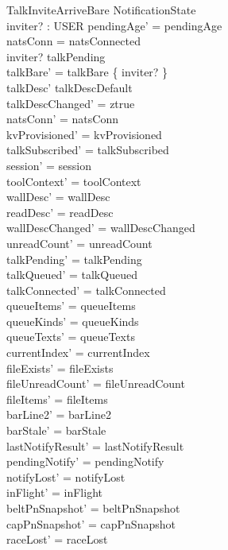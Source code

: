 \documentclass[a4paper,10pt,fleqn]{article}
\begin{document}
\begin{schema}{TalkInviteArriveBare}
  \Delta NotificationState \\
  inviter? : USER
  \where
  pendingAge' = pendingAge \\
  natsConn = natsConnected \\
  inviter? \notin \dom talkPending \\
  talkBare' = talkBare \cup \{ inviter? \} \\
  talkDesc' \neq talkDescDefault \\
  talkDescChanged' = ztrue \\
  natsConn' = natsConn \\
  kvProvisioned' = kvProvisioned \\
  talkSubscribed' = talkSubscribed \\
  session' = session \\
  toolContext' = toolContext \\
  wallDesc' = wallDesc \\
  readDesc' = readDesc \\
  wallDescChanged' = wallDescChanged \\
  unreadCount' = unreadCount \\
  talkPending' = talkPending \\
  talkQueued' = talkQueued \\
  talkConnected' = talkConnected \\
  queueItems' = queueItems \\
  queueKinds' = queueKinds \\
  queueTexts' = queueTexts \\
  currentIndex' = currentIndex \\
  fileExists' = fileExists \\
  fileUnreadCount' = fileUnreadCount \\
  fileItems' = fileItems \\
  barLine2' = barLine2 \\
  barStale' = barStale \\
  lastNotifyResult' = lastNotifyResult \\
  pendingNotify' = pendingNotify \\
  notifyLost' = notifyLost \\
  inFlight' = inFlight \\
  beltPnSnapshot' = beltPnSnapshot \\
  capPnSnapshot' = capPnSnapshot \\
  raceLost' = raceLost \\

\end{schema}
\end{document}
